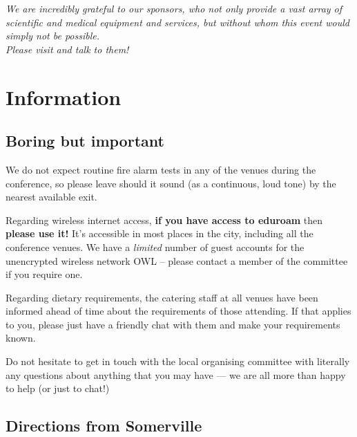 \documentclass[a5paper,10pt,twoside,onecolumn,openany,helvetica,showtrims]{memoir}
\begin{document}
\clearpage
\begin{vplace}[1]
\begin{center}
\begin{minipage}{0.6\textwidth}
	\itshape We are incredibly grateful to our sponsors, who not only provide a vast array of scientific and medical equipment and services, but without whom this event would simply not be possible. \\[2em]
	
	Please visit and talk to them!
\end{minipage}
\end{center}
\end{vplace}
\chapter{Information}
\vspace{-5em}
\section*{Boring but important}
We do not expect routine fire alarm tests in any of the venues during the conference, so please leave should it sound (as a continuous, loud tone) by the nearest available exit.

Regarding wireless internet access, \textbf{if you have access to eduroam} then \textbf{please use it!} It's accessible in most places in the city, including all the conference venues. We have a \emph{limited} number of guest accounts for the unencrypted wireless network OWL -- please contact a member of the committee if you require one.

Regarding dietary requirements, the catering staff at all venues have been informed ahead of time about the requirements of those attending. If that applies to you, please just have a friendly chat with them and make your requirements known. 


Do not hesitate to get in touch with the local organising committee with literally any questions about anything that you may have --- we are all more than happy to help (or just to chat!) 
\section*{Directions from Somerville}
\end{document}
